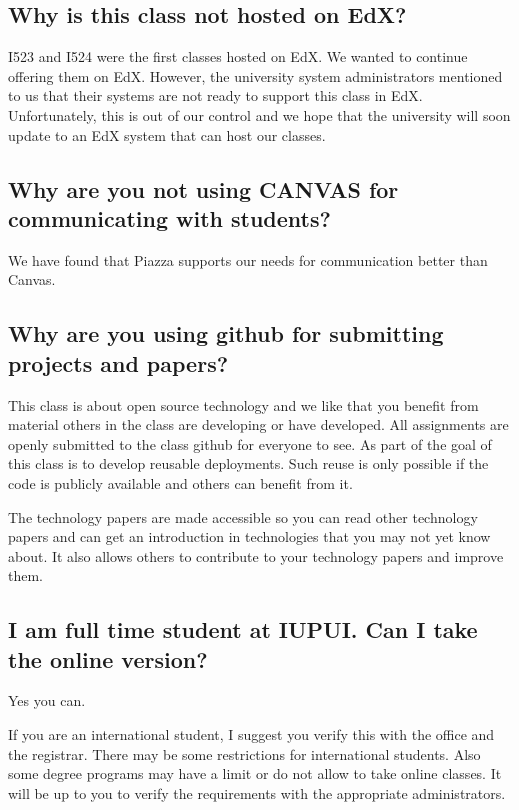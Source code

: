 \subsection{Why is this class not hosted on EdX?}
\label{\detokenize{faq:why-is-this-class-not-hosted-on-edx}}
I523 and I524 were the first classes hosted on EdX. We wanted to
continue offering them on EdX. However, the university system
administrators mentioned to us that their systems are not ready to
support this class in EdX. Unfortunately, this is out of our control
and we hope that the university will soon update to an EdX system that
can host our classes.


\subsection{Why are you not using CANVAS for communicating with students?}
\label{\detokenize{faq:why-are-you-not-using-canvas-for-communicating-with-students}}
We have found that Piazza supports our needs for communication better than Canvas.


\subsection{Why are you using github for submitting projects and papers?}
\label{\detokenize{faq:why-are-you-using-github-for-submitting-projects-and-papers}}
This class is about open source technology and we like that you benefit
from material others in the class are developing or have developed. All
assignments are openly submitted to the class github for everyone to
see. As part of the goal of this class is to develop reusable
deployments. Such reuse is only possible if the code is publicly
available and others can benefit from it.

The technology papers are made accessible so you can read other
technology papers and can get an introduction in technologies that you
may not yet know about. It also allows others to contribute to your
technology papers and improve them.


\subsection{I am full time student at IUPUI. Can I take the online version?}
\label{\detokenize{faq:i-am-full-time-student-at-iupui-can-i-take-the-online-version}}
Yes you can.

If you are an international student, I suggest you verify this with
the office and the registrar. There may be some restrictions for
international students. Also some degree programs may have a limit or
do not allow to take online classes. It will be up to you to verify
the requirements with the appropriate administrators.


